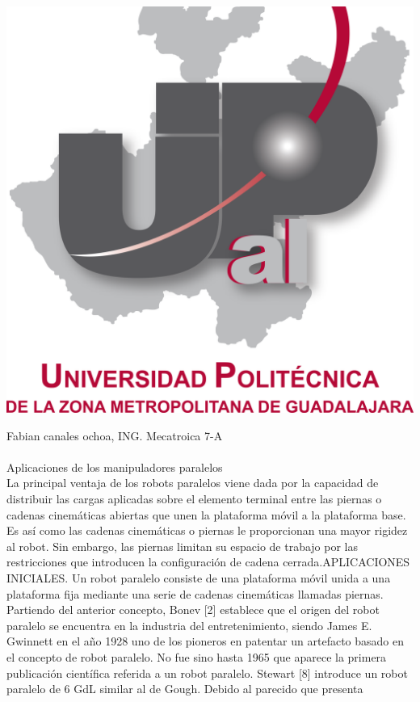 \documentclass[10pt,a4paper]{article}
\begin{document}
\begin{center}
\includegraphics[scale=0.25]{imagenes/upzmg.png} 
\end{center}
\large \huge Fabian canales ochoa, ING. Mecatroica 7-A
\\ \\ 
Aplicaciones de los manipuladores paralelos\\
La principal ventaja de los robots paralelos viene dada por la capacidad de distribuir las cargas
aplicadas sobre el elemento terminal entre las piernas o cadenas cinemáticas abiertas que unen la
plataforma móvil a la plataforma base. Es así como las cadenas cinemáticas o piernas le
proporcionan una mayor rigidez al robot. Sin embargo, las piernas limitan su espacio de trabajo por las
restricciones que introducen la configuración de cadena cerrada.APLICACIONES INICIALES.
Un robot paralelo consiste de una plataforma móvil unida a una plataforma fija mediante una serie
de cadenas cinemáticas llamadas piernas. Partiendo del anterior concepto, Bonev [2] establece que el
origen del robot paralelo se encuentra en la industria del entretenimiento, siendo James E. Gwinnett en
el año 1928 uno de los pioneros en patentar un artefacto basado en el concepto de robot paralelo.
No fue sino hasta 1965 que aparece la primera publicación científica referida a un robot paralelo.
Stewart [8] introduce un robot paralelo de 6 GdL similar al de Gough. Debido al parecido que presenta
\end{document}

